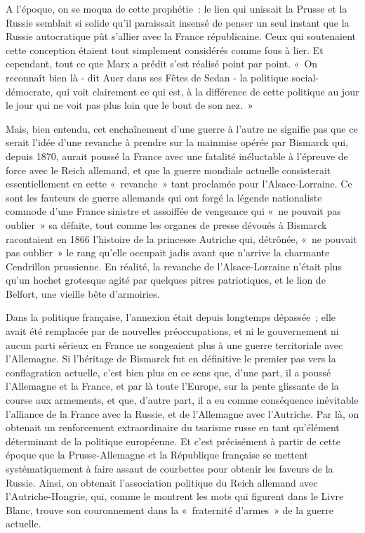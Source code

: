 \documentclass[french,twoside]{book} %
\begin{document}
\noindent A l’époque, on se moqua de cette prophétie : le lien qui unissait la Prusse et la Russie semblait si solide qu’il paraissait insensé de penser un seul instant que la Russie autocratique pût s’allier avec la France républicaine. Ceux qui soutenaient cette conception étaient tout simplement considérés comme fous à lier. Et cependant, tout ce que Marx a prédit s’est réalisé point par point. « On reconnaît bien là - dit Auer dans ses Fêtes de Sedan - la politique social-démocrate, qui voit clairement ce qui est, à la différence de cette politique au jour le jour qui ne voit pas plus loin que le bout de son nez. »\par
Mais, bien entendu, cet enchaînement d’une guerre à l’autre ne signifie pas que ce serait l’idée d’une revanche à prendre sur la mainmise opérée par Bismarck qui, depuis 1870, aurait poussé la France avec une fatalité inéluctable à l’épreuve de force avec le Reich allemand, et que la guerre mondiale actuelle consisterait essentiellement en cette « revanche » tant proclamée pour l’Alsace-Lorraine. Ce sont les fauteurs de guerre allemands qui ont forgé la légende nationaliste commode d’une France sinistre et assoiffée de vengeance qui « ne pouvait pas oublier » sa défaite, tout comme les organes de presse dévoués à Bismarck racontaient en 1866 l’histoire de la princesse Autriche qui, détrônée, « ne pouvait pas oublier » le rang qu’elle occupait jadis avant que n’arrive la charmante Cendrillon prussienne. En réalité, la revanche de l’Alsace-Lorraine n’était plus qu’un hochet grotesque agité par quelques pitres patriotiques, et le lion de Belfort, une vieille bête d’armoiries.\par
Dans la politique française, l’annexion était depuis longtemps dépassée ; elle avait été remplacée par de nouvelles préoccupations, et ni le gouvernement ni aucun parti sérieux en France ne songeaient plus à une guerre territoriale avec l’Allemagne. Si l’héritage de Bismarck fut en définitive le premier pas vers la conflagration actuelle, c’est bien plus en ce sens que, d’une part, il a poussé l’Allemagne et la France, et par là toute l’Europe, sur la pente glissante de la course aux armements, et que, d’autre part, il a eu comme conséquence inévitable l’alliance de la France avec la Russie, et de l’Allemagne avec l’Autriche. Par là, on obtenait un renforcement extraordinaire du tsarisme russe en tant qu’élément déterminant de la politique européenne. Et c’est précisément à partir de cette époque que la Prusse-Allemagne et la République française se mettent systématiquement à faire assaut de courbettes pour obtenir les faveurs de la Russie. Ainsi, on obtenait l’association politique du Reich allemand avec l’Autriche-Hongrie, qui, comme le montrent les mots qui figurent dans le Livre Blanc, trouve son couronnement dans la « fraternité d’armes » de la guerre actuelle.\par
\end{document}
